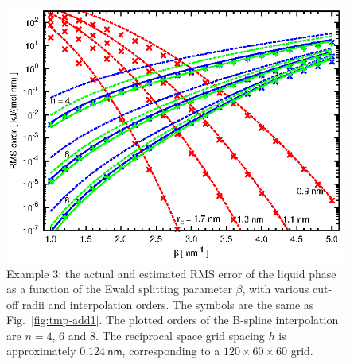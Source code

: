 \documentclass[aps,pre,preprint,unsortedaddress]{revtex4}
\begin{document}
\begin{figure}
  \centering
  \includegraphics[]{fig.order.ik.ana.eps}
  \caption{Example 3: the actual and estimated RMS error of the liquid
    phase as a function of the Ewald splitting parameter $\beta$,
    with various cut-off radii and interpolation orders.
    The symbols are the same as Fig.~\ref{fig:tmp-add1}.
    The plotted orders of the B-spline interpolation are $n=4$, 6 and 8.
    The reciprocal space grid spacing $h$ is approximately
    $0.124\:\textsf{nm}$, corresponding to
    a $120\times 60\times 60$ grid.
  }
  \label{fig:tmp-add2}
\end{figure}
\end{document}
